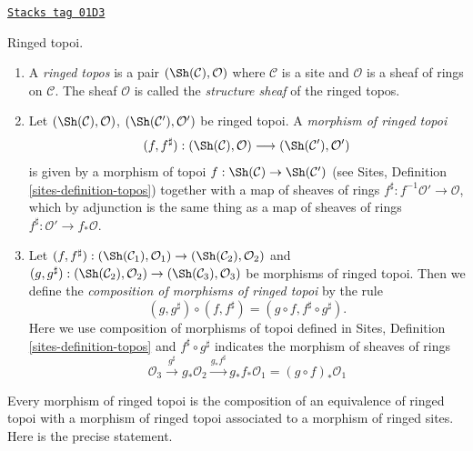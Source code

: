 \begin{definition}
\label{sites-modules-definition-ringed-topos}
\href{https://stacks.math.columbia.edu/tag/01D3}{\texttt{Stacks tag 01D3}}

Ringed topoi.
\begin{enumerate}
\item A {\it ringed topos} is a pair
$(\Sh(\mathcal{C}), \mathcal{O})$
where $\mathcal{C}$ is a site and $\mathcal{O}$ is a sheaf of rings
on $\mathcal{C}$. The sheaf $\mathcal{O}$ is called the
{\it structure sheaf} of the ringed topos.
\item Let $(\Sh(\mathcal{C}), \mathcal{O})$,
$(\Sh(\mathcal{C}'), \mathcal{O}')$ be ringed topoi.
A {\it morphism of ringed topoi}
$$
(f, f^\sharp) :
(\Sh(\mathcal{C}), \mathcal{O})
\longrightarrow
(\Sh(\mathcal{C}'), \mathcal{O}')
$$
is given by a morphism of topoi $f : \Sh(\mathcal{C}) \to \Sh(\mathcal{C}')$
(see Sites, Definition \ref{sites-definition-topos})
together with a map of sheaves of rings
$f^\sharp : f^{-1}\mathcal{O}' \to \mathcal{O}$, which by adjunction
is the same thing as a map of sheaves of rings
$f^\sharp : \mathcal{O}' \to f_*\mathcal{O}$.
\item Let
$(f, f^\sharp) :
(\Sh(\mathcal{C}_1), \mathcal{O}_1)
\to (\Sh(\mathcal{C}_2), \mathcal{O}_2)$ and
$(g, g^\sharp) :
(\Sh(\mathcal{C}_2), \mathcal{O}_2) \to
(\Sh(\mathcal{C}_3), \mathcal{O}_3)$
be morphisms of ringed topoi. Then we define
the {\it composition of morphisms of ringed topoi}
by the rule
$$
(g, g^\sharp) \circ (f, f^\sharp) = (g \circ f, f^\sharp \circ g^\sharp).
$$
Here we use composition of morphisms of topoi defined in
Sites, Definition \ref{sites-definition-topos}
and $f^\sharp \circ g^\sharp$ indicates the morphism of sheaves of
rings
$$
\mathcal{O}_3 \xrightarrow{g^\sharp} g_*\mathcal{O}_2
\xrightarrow{g_*f^\sharp} g_*f_*\mathcal{O}_1 = (g \circ f)_*\mathcal{O}_1
$$
\end{enumerate}
\end{definition}

Every morphism of ringed topoi is the composition of an equivalence
of ringed topoi with a morphism of ringed topoi associated to a morphism
of ringed sites. Here is the precise statement.


